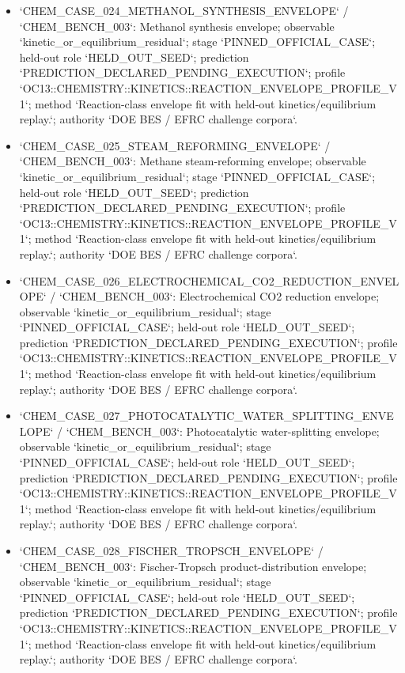 \begin{itemize}
\item `CHEM\_CASE\_024\_METHANOL\_SYNTHESIS\_ENVELOPE` / `CHEM\_BENCH\_003`: Methanol synthesis envelope; observable `kinetic\_or\_equilibrium\_residual`; stage `PINNED\_OFFICIAL\_CASE`; held-out role `HELD\_OUT\_SEED`; prediction `PREDICTION\_DECLARED\_PENDING\_EXECUTION`; profile `OC13::CHEMISTRY::KINETICS::REACTION\_ENVELOPE\_PROFILE\_V1`; method `Reaction-class envelope fit with held-out kinetics/equilibrium replay.`; authority `DOE BES / EFRC challenge corpora`.
\item `CHEM\_CASE\_025\_STEAM\_REFORMING\_ENVELOPE` / `CHEM\_BENCH\_003`: Methane steam-reforming envelope; observable `kinetic\_or\_equilibrium\_residual`; stage `PINNED\_OFFICIAL\_CASE`; held-out role `HELD\_OUT\_SEED`; prediction `PREDICTION\_DECLARED\_PENDING\_EXECUTION`; profile `OC13::CHEMISTRY::KINETICS::REACTION\_ENVELOPE\_PROFILE\_V1`; method `Reaction-class envelope fit with held-out kinetics/equilibrium replay.`; authority `DOE BES / EFRC challenge corpora`.
\item `CHEM\_CASE\_026\_ELECTROCHEMICAL\_CO2\_REDUCTION\_ENVELOPE` / `CHEM\_BENCH\_003`: Electrochemical CO2 reduction envelope; observable `kinetic\_or\_equilibrium\_residual`; stage `PINNED\_OFFICIAL\_CASE`; held-out role `HELD\_OUT\_SEED`; prediction `PREDICTION\_DECLARED\_PENDING\_EXECUTION`; profile `OC13::CHEMISTRY::KINETICS::REACTION\_ENVELOPE\_PROFILE\_V1`; method `Reaction-class envelope fit with held-out kinetics/equilibrium replay.`; authority `DOE BES / EFRC challenge corpora`.
\item `CHEM\_CASE\_027\_PHOTOCATALYTIC\_WATER\_SPLITTING\_ENVELOPE` / `CHEM\_BENCH\_003`: Photocatalytic water-splitting envelope; observable `kinetic\_or\_equilibrium\_residual`; stage `PINNED\_OFFICIAL\_CASE`; held-out role `HELD\_OUT\_SEED`; prediction `PREDICTION\_DECLARED\_PENDING\_EXECUTION`; profile `OC13::CHEMISTRY::KINETICS::REACTION\_ENVELOPE\_PROFILE\_V1`; method `Reaction-class envelope fit with held-out kinetics/equilibrium replay.`; authority `DOE BES / EFRC challenge corpora`.
\item `CHEM\_CASE\_028\_FISCHER\_TROPSCH\_ENVELOPE` / `CHEM\_BENCH\_003`: Fischer-Tropsch product-distribution envelope; observable `kinetic\_or\_equilibrium\_residual`; stage `PINNED\_OFFICIAL\_CASE`; held-out role `HELD\_OUT\_SEED`; prediction `PREDICTION\_DECLARED\_PENDING\_EXECUTION`; profile `OC13::CHEMISTRY::KINETICS::REACTION\_ENVELOPE\_PROFILE\_V1`; method `Reaction-class envelope fit with held-out kinetics/equilibrium replay.`; authority `DOE BES / EFRC challenge corpora`.

\end{itemize}
